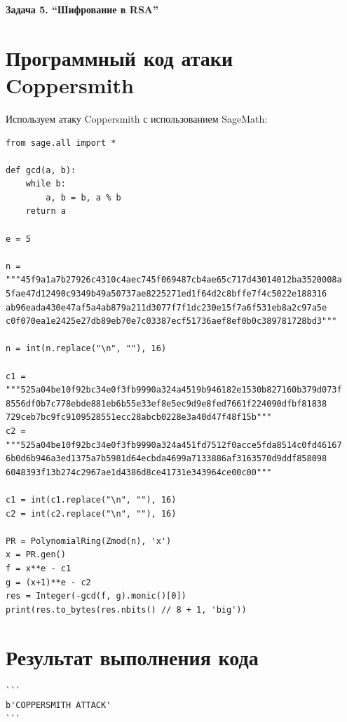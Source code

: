 \documentclass{article}
\begin{document}
\begin{center}
    \Huge\textbf{Задача 5. ``Шифрование в RSA''}
\end{center}

\section{Программный код атаки Coppersmith}

Используем атаку Coppersmith с использованием SageMath:

\begin{verbatim}
from sage.all import *

def gcd(a, b):
    while b:
        a, b = b, a % b
    return a

e = 5

n = """45f9a1a7b27926c4310c4aec745f069487cb4ae65c717d43014012ba3520008a
5fae47d12490c9349b49a50737ae8225271ed1f64d2c8bffe7f4c5022e188316
ab96eada430e47af5a4ab879a211d3077f7f1dc230e15f7a6f531eb8a2c97a5e
c0f070ea1e2425e27db89eb70e7c03387ecf51736aef8ef0b0c389781728bd3"""

n = int(n.replace("\n", ""), 16)

c1 = """525a04be10f92bc34e0f3fb9990a324a4519b946182e1530b827160b379d073f
8556df0b7c778ebde881eb6b55e33ef8e5ec9d9e8fed7661f224090dfbf81838
729ceb7bc9fc9109528551ecc28abcb0228e3a40d47f48f15b"""
c2 = """525a04be10f92bc34e0f3fb9990a324a451fd7512f0acce5fda8514c0fd46167
6b0d6b946a3ed1375a7b5981d64ecbda4699a7133886af3163570d9ddf858098
6048393f13b274c2967ae1d4386d8ce41731e343964ce00c00"""

c1 = int(c1.replace("\n", ""), 16)
c2 = int(c2.replace("\n", ""), 16)

PR = PolynomialRing(Zmod(n), 'x')
x = PR.gen()
f = x**e - c1
g = (x+1)**e - c2
res = Integer(-gcd(f, g).monic()[0])
print(res.to_bytes(res.nbits() // 8 + 1, 'big'))
\end{verbatim}

\section{Результат выполнения кода}

\begin{verbatim}
```
b'COPPERSMITH ATTACK'
```
\end{verbatim}
\end{document}
